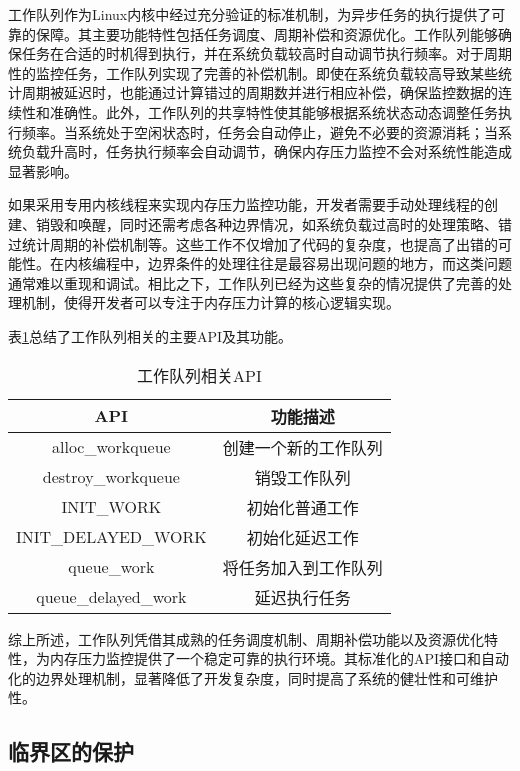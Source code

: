 工作队列作为Linux内核中经过充分验证的标准机制，为异步任务的执行提供了可靠的保障。其主要功能特性包括任务调度、周期补偿和资源优化。工作队列能够确保任务在合适的时机得到执行，并在系统负载较高时自动调节执行频率。对于周期性的监控任务，工作队列实现了完善的补偿机制。即使在系统负载较高导致某些统计周期被延迟时，也能通过计算错过的周期数并进行相应补偿，确保监控数据的连续性和准确性。此外，工作队列的共享特性使其能够根据系统状态动态调整任务执行频率。当系统处于空闲状态时，任务会自动停止，避免不必要的资源消耗；当系统负载升高时，任务执行频率会自动调节，确保内存压力监控不会对系统性能造成显著影响。

如果采用专用内核线程来实现内存压力监控功能，开发者需要手动处理线程的创建、销毁和唤醒，同时还需考虑各种边界情况，如系统负载过高时的处理策略、错过统计周期的补偿机制等。这些工作不仅增加了代码的复杂度，也提高了出错的可能性。在内核编程中，边界条件的处理往往是最容易出现问题的地方，而这类问题通常难以重现和调试。相比之下，工作队列已经为这些复杂的情况提供了完善的处理机制，使得开发者可以专注于内存压力计算的核心逻辑实现。

表\ref{tab:workqueue_api}总结了工作队列相关的主要API及其功能。
\begin{table}[htbp]
\centering
\caption{工作队列相关API}
\label{tab:workqueue_api}
\begin{tabular}{cc}
\toprule
\textbf{API} & \textbf{功能描述} \\
\midrule
alloc\_workqueue & 创建一个新的工作队列 \\
\midrule
destroy\_workqueue & 销毁工作队列 \\
\midrule
INIT\_WORK & 初始化普通工作 \\
\midrule
INIT\_DELAYED\_WORK & 初始化延迟工作 \\
\midrule
queue\_work & 将任务加入到工作队列 \\
\midrule
queue\_delayed\_work & 延迟执行任务 \\
\bottomrule
\end{tabular}
\end{table}
综上所述，工作队列凭借其成熟的任务调度机制、周期补偿功能以及资源优化特性，为内存压力监控提供了一个稳定可靠的执行环境。其标准化的API接口和自动化的边界处理机制，显著降低了开发复杂度，同时提高了系统的健壮性和可维护性。


\subsection{临界区的保护}

